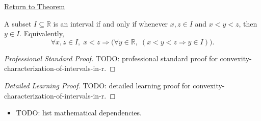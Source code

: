 \newpage
{}
\label{prf:convexity-characterization-of-intervals-in-r}

\begin{remark*}[Return]
\hyperref[thm:convexity-characterization-of-intervals-in-r]{Return to Theorem}
\end{remark*}

\begin{theorem*}
A subset $I \subseteq \mathbb{R}$ is an interval if and only if
whenever $x,z \in I$ and $x < y < z$, then $y \in I$.
Equivalently,
\[
\forall x,z \in I,\; x<z \Rightarrow
\bigl(
\forall y \in \mathbb{R},\;
(x<y<z \Rightarrow y \in I)
\bigr).
\]
\end{theorem*}

\begin{proof}[Professional Standard Proof]
\LRAProofBodyStart
TODO: professional standard proof for convexity-characterization-of-intervals-in-r.
\end{proof}

\begin{proof}[Detailed Learning Proof]
\LRAProofBodyStart
TODO: detailed learning proof for convexity-characterization-of-intervals-in-r.
\end{proof}

\begin{remark*}
\end{remark*}

\begin{dependencies}
\begin{itemize}
  \item TODO: list mathematical dependencies.
\end{itemize}
\end{dependencies}

\clearpage

